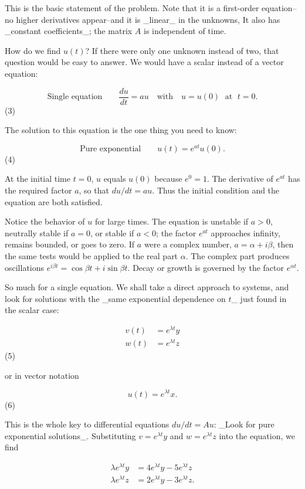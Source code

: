 This is the basic statement of the problem. Note that it is a first-order equation--no higher derivatives appear--and it is _linear_ in the unknowns, It also has _constant coefficients_; the matrix \(A\) is independent of time.

How do we find \(u(t)\)? If there were only one unknown instead of two, that question would be easy to answer. We would have a scalar instead of a vector equation:

\[\text{{Single equation}}\qquad\frac{du}{dt}=au\quad\text{with}\quad u=u(0)\; \text{ at }\;t=0.\] (3)

The solution to this equation is the one thing you need to know:

\[\text{{Pure exponential}}\qquad u(t)=e^{at}u(0).\] (4)

At the initial time \(t=0\), \(u\) equals \(u(0)\) because \(e^{0}=1\). The derivative of \(e^{at}\) has the required factor \(a\), so that \(du/dt=au\). Thus the initial condition and the equation are both satisfied.

Notice the behavior of \(u\) for large times. The equation is unstable if \(a>0\), neutrally stable if \(a=0\), or stable if \(a<0\); the factor \(e^{at}\) approaches infinity, remains bounded, or goes to zero. If \(a\) were a complex number, \(a=\alpha+i\beta\), then the same tests would be applied to the real part \(\alpha\). The complex part produces oscillations \(e^{i\beta t}=\cos\beta t+i\sin\beta t\). Decay or growth is governed by the factor \(e^{\alpha t}\).

So much for a single equation. We shall take a direct approach to systems, and look for solutions with the _same exponential dependence on \(t\)_ just found in the scalar case:

\[\begin{split} v(t)&=e^{\lambda t}y\\ w(t)&=e^{\lambda t}z\end{split}\] (5)

or in vector notation

\[u(t)=e^{\lambda t}x.\] (6)

This is the whole key to differential equations \(du/dt=Au\): _Look for pure exponential solutions_. Substituting \(v=e^{\lambda t}y\) and \(w=e^{\lambda t}z\) into the equation, we find

\[\begin{split}\lambda e^{\lambda t}y&=4e^{\lambda t }y-5e^{\lambda t}z\\ \lambda e^{\lambda t}z&=2e^{\lambda t}y-3e^{\lambda t }z.\end{split}\]

